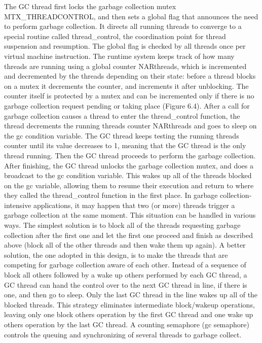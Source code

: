 The GC thread first locks the garbage collection mutex MTX\_THREADCONTROL, and then sets a global
flag that announces the need to perform garbage collection. It directs all running threads to
converge to a special routine called thread\_control, the coordination point for thread suspension
and resumption. The global flag is checked by all threads once per virtual machine instruction.
The runtime system keeps track of how many threads are running using a global counter NARthreads,
which is incremented and decremented by the threads depending on their state: before a thread
blocks on a mutex it decrements the counter, and increments it after unblocking. The counter
itself is protected by a mutex and can be incremented only if there is no garbage collection
request pending or taking place (Figure 6.4). 
After a call for garbage collection causes a thread to enter the thread\_control function,
the thread decrements the running threads counter NARthreads and goes to sleep on the gc
condition variable. The GC thread keeps testing the running threads counter until its value
decreases to 1, meaning that the GC thread is the only thread running. Then the GC thread
proceeds to perform the garbage collection. After finishing, the GC thread unlocks the
garbage collection mutex, and does a broadcast to the gc condition variable. This wakes up
all of the threads blocked on the gc variable, allowing them to resume their execution and
return to where they called the thread\_control function in the first place. 
In garbage collection-intensive applications, it may happen that two (or more) threads trigger
a garbage collection at the same moment. This situation can be handled in various ways.
The simplest solution is to block all of the threads requesting garbage collection after
the first one and let the first one proceed and finish as described above (block all of the
other threads and then wake them up again). A better solution, the one adopted in this design,
is to make the threads that are competing for garbage collection aware of each other. Instead
of a sequence of block all others followed by a wake up others performed by each GC thread,
a GC thread can hand the control over to the next GC thread in line, if there is one, and then
go to sleep. Only the last GC thread in the line wakes up all of the blocked threads. This strategy
eliminates intermediate block/wakeup operations, leaving only one block others operation
by the first GC thread and one wake up others operation by the last GC thread. A counting
semaphore (gc semaphore) controls the queuing and synchronizing of several threads to garbage collect.
